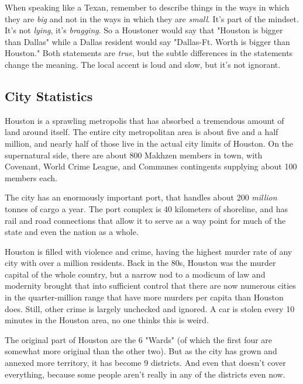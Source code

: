 When speaking like a Texan, remember to describe things in the ways in which they are \textit{big} and not in the ways in which they are \textit{small}. It's part of the mindset. It's not \textit{lying}, it's \textit{bragging}. So a Houstoner would say that "Houston is bigger than Dallas" while a Dallas resident would say "Dallas-Ft. Worth is bigger than Houston." Both statements are \textit{true}, but the subtle differences in the statements change the meaning. The local accent is loud and slow, but it's not ignorant.

\subsection{City Statistics}

\hspace{\parindent} Houston is a sprawling metropolis that has absorbed a tremendous amount of land around itself. The entire city metropolitan area is about five and a half million, and nearly half of those live in the actual city limits of Houston. On the supernatural side, there are about 800 Makhzen members in town, with Covenant, World Crime League, and Communes contingents supplying about 100 members each.

The city has an enormously important port, that handles about 200 \textit{million} tonnes of cargo a year. The port complex is 40 kilometers of shoreline, and has rail and road connections that allow it to serve as a way point for much of the state and even the nation as a whole.

Houston is filled with violence and crime, having the highest murder rate of any city with over a million residents. Back in the 80s, Houston was the murder capital of the whole country, but a narrow nod to a modicum of law and modernity brought that into sufficient control that there are now numerous cities in the quarter-million range that have more murders per capita than Houston does. Still, other crime is largely unchecked and ignored. A car is stolen every 10 minutes in the Houston area, no one thinks this is weird.

The original part of Houston are the 6 "Wards" (of which the first four are somewhat more original than the other two). But as the city has grown and annexed more territory, it has become 9 districts. And even that doesn't cover everything, because some people aren't really in any of the districts even now.

